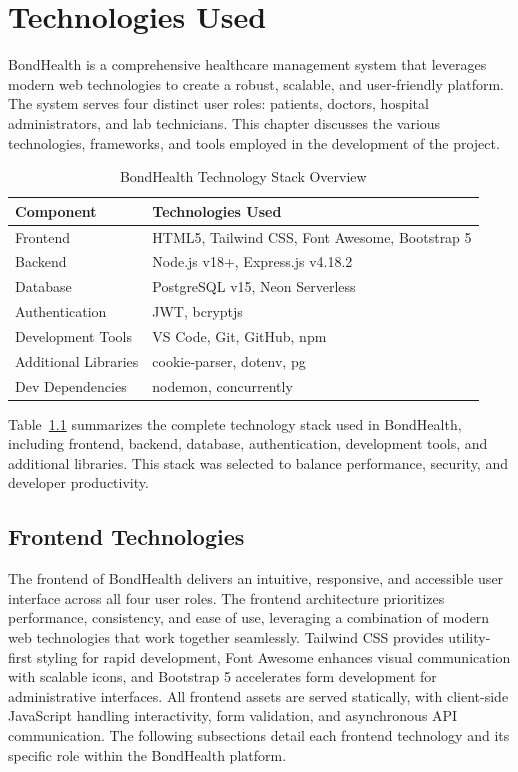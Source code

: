 \chapter{Technologies Used}

\justifying
\noindent BondHealth is a comprehensive healthcare management system that leverages modern web technologies to create a robust, scalable, and user-friendly platform. The system serves four distinct user roles: patients, doctors, hospital administrators, and lab technicians. This chapter discusses the various technologies, frameworks, and tools employed in the development of the project.

\begin{table}[H]
\centering
\caption{BondHealth Technology Stack Overview}
\label{tab:tech-stack}
\begin{tabular}{|l|p{10cm}|}
\hline
\textbf{Component} & \textbf{Technologies Used} \\
\hline
Frontend & HTML5, Tailwind CSS, Font Awesome, Bootstrap 5 \\
\hline
Backend & Node.js v18+, Express.js v4.18.2 \\
\hline
Database & PostgreSQL v15, Neon Serverless \\
\hline
Authentication & JWT, bcryptjs \\
\hline
Development Tools & VS Code, Git, GitHub, npm \\
\hline
Additional Libraries & cookie-parser, dotenv, pg \\
\hline
Dev Dependencies & nodemon, concurrently \\
\hline
\end{tabular}
\end{table}
\noindent Table~\ref{tab:tech-stack} summarizes the complete technology stack used in BondHealth, including frontend, backend, database, authentication, development tools, and additional libraries. This stack was selected to balance performance, security, and developer productivity.

\section{Frontend Technologies}

\justifying
\noindent The frontend of BondHealth delivers an intuitive, responsive, and accessible user interface across all four user roles. The frontend architecture prioritizes performance, consistency, and ease of use, leveraging a combination of modern web technologies that work together seamlessly. Tailwind CSS provides utility-first styling for rapid development, Font Awesome enhances visual communication with scalable icons, and Bootstrap 5 accelerates form development for administrative interfaces. All frontend assets are served statically, with client-side JavaScript handling interactivity, form validation, and asynchronous API communication. The following subsections detail each frontend technology and its specific role within the BondHealth platform.

